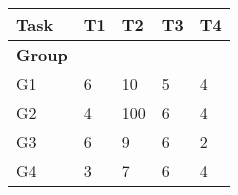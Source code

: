 \begin{center}
\begin{tabular}{|l|l|l|l|l|}
\hline
\textbf{Task} & \textbf{T1} & \textbf{T2} & \textbf{T3} & \textbf{T4} \\ \hline
\textbf{Group} & & & & \\ \hline
G1 & 6 & 10 & 5 & 4 \\ \hline
G2 & 4 & 100 & 6 & 4 \\ \hline
G3 & 6 & 9 & 6 & 2 \\ \hline
G4 & 3 & 7 & 6 & 4 \\ \hline
\end{tabular}
\end{center}